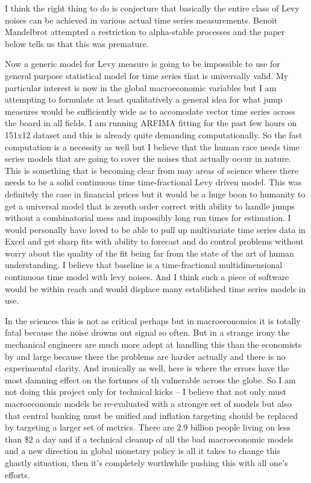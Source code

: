 \documentclass{amsart}
\begin{document}
I think the right thing to do is conjecture that basically the entire class of Levy noises can be achieved in various actual time series measurements.  Benoit Mandelbrot attempted a restriction to alpha-stable processes and the paper below tells us that this was premature.  

Now a generic model for Levy measure is going to be impossible to use for general purpose statistical model for time series that is universally valid.  My particular interest is now in the global macroeconomic variables but I am attempting to formulate at least qualitatively a general idea for what jump measures would be sufficiently wide as to accomodate vector time series across the board in all fields.  I am running ARFIMA fitting for the past few hours on 151x12 dataset and this is already quite demanding computationally.  So the fast computation is a necessity as well but I believe that the human race needs time series models that are going to cover the noises that actually occur in nature.  This is something that is becoming clear from may areas of science where there needs to be a solid continuous time time-fractional Levy driven model.  This was definitely the case in financial prices but it would be a huge boon to humanity to get a universal model that is zeroth order correct with ability to handle jumps without a combinatorial mess and impossibly long run times for estimation.  I would personally have loved to be able to pull up multivariate time series data in Excel and get sharp fits with ability to forecast and do control problems without worry about the quality of the fit being far from the state of the art of human understanding.  I believe that baseline is a time-fractional multidimensional continuous time model with levy noises. And I think such a piece of software would be within reach and would displace many established time series models in use.  

In the sciences this is not as critical perhaps but in macroeconomics it is totally fatal because the noise drowns out signal so often.  But in a strange irony the mechanical engineers are much more adept at handling this than the economists by and large because there the problems are harder actually and there is no experimental clarity.   And ironically as well, here is where the errors have the most damning effect on the fortunes of th vulnerable across the globe.  So I am not doing this project only for technical kicks -- I believe that not only must macroeconomic models be re-evaluated with a stronger set of models but also that central banking must be unified and inflation targeting should be replaced by targeting a larger set of metrics.  There are 2.9 billion people living on less than \$2 a day and if a technical cleanup of all the bad macroeconomic models and a new direction in global monetary policy is all it takes to change this ghastly situation, then it's completely worthwhile pushing this with all one's efforts.
\end{document}
